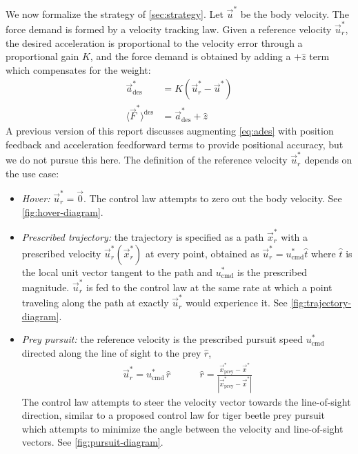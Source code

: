 \documentclass[11pt,letterpaper]{article}
\begin{document}
We now formalize the strategy of \autoref{sec:strategy}.
Let $\vec{u}^*$ be the body velocity.
The force demand is formed by a velocity tracking law.
Given a reference velocity $\vec{u}^*_r$, the desired
acceleration is proportional to the velocity error through a
proportional gain $K$, and the force demand is obtained
by adding a $+\hat{z}$ term which compensates for the weight:
\begin{align}
    \vec{a}^*_\text{des} &= K \left( \vec{u}^*_r - \vec{u}^* \right) \label{eq:ades} \\
    \langle \vec{F}^* \rangle^\text{des} &= \vec{a}^*_\text{des} + \hat{z} \label{eq:fdes}
\end{align}
A previous version of
this report discusses augmenting \autoref{eq:ades} with
position feedback and acceleration feedforward terms to
provide positional accuracy, but we do not pursue this here.
The definition of the reference velocity $\vec{u}^*_r$ depends on the use case:
\begin{itemize}
    \item \emph{Hover:} $\vec{u}^*_r = \vec{0}$. The control law
        attempts to zero out the body velocity. See \autoref{fig:hover-diagram}.
    \item \emph{Prescribed trajectory:} the trajectory is
        specified as a path $\vec{x}^*_r$  with a prescribed
        velocity $\vec{u}^*_r(\vec{x}^*_r)$ at every point,
        obtained as $\vec{u}^*_r = u^*_\text{cmd} \hat{t}$
        where $\hat{t}$ is the local unit vector tangent to the
        path and $u^*_\text{cmd}$ is the prescribed magnitude.
        $\vec{u}^*_r$ is fed to the control law at the same
        rate at which a point traveling along the
        path at exactly $\vec{u}^*_r$ would experience it.
        See \autoref{fig:trajectory-diagram}.
    \item \emph{Prey pursuit:} the reference velocity is the
        prescribed pursuit speed $u^*_\text{cmd}$ directed
        along the line of sight to the prey $\hat{r}$,
        \begin{align}
            \vec{u}^*_r = u^*_\text{cmd}\, \hat{r}
            \quad\quad\quad
            \hat{r} = \frac{\vec{x}^*_\text{prey} - \vec{x}^*}{|\vec{x}^*_\text{prey} - \vec{x}^*|}
            \label{eq:ur-pursuit}
        \end{align}
        The control law attempts to steer
        the velocity vector towards the line-of-sight direction,
        similar to a proposed control law for tiger
        beetle prey pursuit~\cite{haselsteiner2014}
        which attempts to minimize the angle between
        the velocity and line-of-sight vectors.
        See \autoref{fig:pursuit-diagram}.
\end{itemize}
\end{document}
